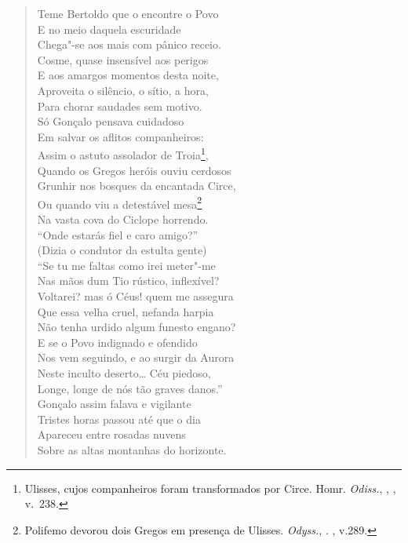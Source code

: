 \begin{verse}
Teme Bertoldo que o encontre o Povo\\ 
E no meio daquela escuridade\\
Chega"-se aos mais com pânico receio.\\
Cosme, quase insensível aos perigos\\
E aos amargos momentos desta noite,\\
Aproveita o silêncio, o sítio, a hora,\\
Para chorar saudades sem motivo.\\
Só Gonçalo pensava cuidadoso\\
Em salvar os aflitos companheiros:\\
Assim o astuto assolador de Troia\footnote{ Ulisses, cujos companheiros foram transformados por Circe. Homr. \textit{Odiss.}, , , v.~238.},\\ 	\index{\Ulis}
Quando os Gregos heróis ouviu cerdosos\\
Grunhir nos bosques da encantada Circe,\\
Ou quando viu a detestável mesa\footnote{ Polifemo devorou dois Gregos
em presença de Ulisses. \textit{Odyss.}, . , v.289.}\\	\index{\Ulis}
Na vasta cova do Ciclope horrendo.\\
``Onde estarás fiel e caro amigo?''\\
(Dizia o condutor da estulta gente)\\
``Se tu me faltas como irei meter"-me\\
Nas mãos dum Tio rústico, inflexível?\\
Voltarei? mas ó Céus! quem me assegura\\
Que essa velha cruel, nefanda harpia\\
Não tenha urdido algum funesto engano?\\
E se o Povo indignado e ofendido\\
Nos vem seguindo, e ao surgir da Aurora\\
Neste inculto deserto\ldots{}  Céu piedoso,\\
Longe, longe de nós tão graves danos.'' \\[10pt]


Gonçalo assim falava e vigilante\\
Tristes horas passou até que o dia\\
Apareceu entre rosadas nuvens\\
Sobre as altas montanhas do horizonte. \\[10pt]

\end{verse}
\pagebreak

